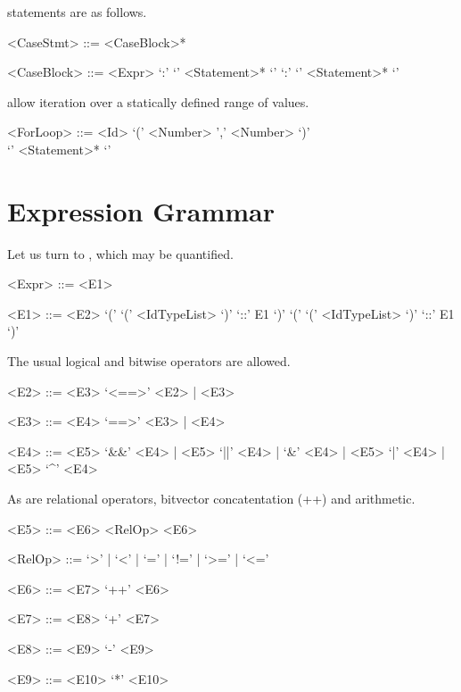  statements are as follows.
\begin{grammar}
    <CaseStmt> ::=  <CaseBlock>* 

    <CaseBlock> ::= <Expr> `:' `{' <Statement>* `}'
                \alt {} `:' `{' <Statement>* `}'
\end{grammar}

 allow iteration over a statically defined range of values.
\begin{grammar}
    <ForLoop> ::=  <Id>   `(' <Number> ',' <Number> `)' \\
                  `{' <Statement>* `}'
\end{grammar}

\section{Expression Grammar}
Let us turn to , which may be quantified. 
\begin{grammar}
    <Expr> ::= <E1>

    <E1> ::= <E2>
         \alt `('  `(' <IdTypeList> `)' `::' E1 `)'
         \alt `('  `(' <IdTypeList> `)' `::' E1 `)'

\end{grammar}

The usual logical and bitwise operators are allowed.
\begin{grammar}
    <E2> ::= <E3> `<==>' <E2> | <E3>

    <E3> ::= <E4> `==>' <E3> | <E4>

    <E4> ::=  <E5> `&&' <E4> | <E5> `||' <E4> | 
          `&' <E4> | <E5> `|' <E4> | <E5> `^' <E4> 
\end{grammar}

As are relational operators, bitvector concatentation (++) and arithmetic.

\begin{grammar}
<E5> ::=  <E6> <RelOp> <E6> 

<RelOp> ::= `>' | `<' | `=' | `!=' | `>=' | `<='

<E6> ::=  <E7> `++' <E6> 

<E7> ::=  <E8> `+' <E7>

<E8> ::=  <E9> `-' <E9>

<E9> ::= <E10> `*' <E10>
\end{grammar}

